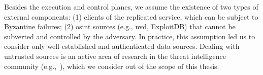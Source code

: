 Besides the execution and control planes, we assume the existence of two types of external components: (1) clients of the replicated service, which can be subject to Byzantine failures; (2) \gls{osint} sources (e.g., \gls{nvd}, ExploitDB) that cannot be subverted and controlled by the adversary.
In practice, this assumption led us to consider only well-established and authenticated data sources.
Dealing with untrusted sources is an active area of research in the threat intelligence community (e.g.,~\cite{Sabottke:2015,Liu:2015}), which we consider out of the scope of this thesis.










